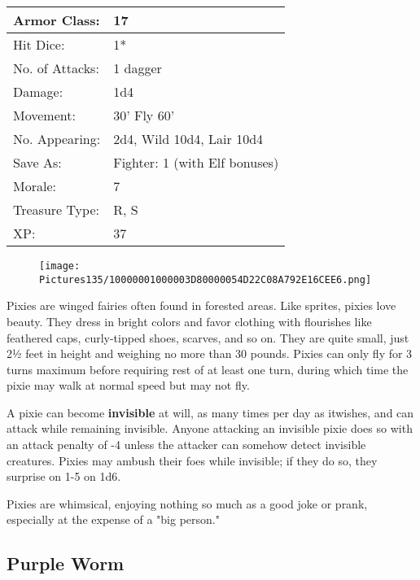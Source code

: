 \documentclass[a4paper,twoside,openany,10pt]{book}
\begin{document}
\begin{multicols}{2}
\begin{tabularx}{0.50\textwidth}{@{}lX@{}}
Armor Class: & 17 \\\hline
Hit Dice: & 1* \\\hline
No. of Attacks: & 1 dagger \\\hline
Damage: & 1d4 \\\hline
Movement: & 30' Fly 60' \\\hline
No. Appearing: & 2d4, Wild 10d4, Lair 10d4 \\\hline
Save As: & Fighter: 1 (with Elf bonuses) \\\hline
Morale: & 7 \\\hline
Treasure Type: & R, S \\\hline
XP: & 37 \\\hline
\end{tabularx}\medskip

\begin{wrapfigure}{l}{0.25\textwidth}
 \texttt{[image: Pictures135/10000001000003D80000054D22C08A792E16CEE6.png]} 
\end{wrapfigure}

Pixies are winged fairies often found in forested areas. Like sprites, pixies love beauty. They dress in bright colors and favor clothing with flourishes like feathered caps, curly-tipped shoes, scarves, and so on. They are quite small, just 2½ feet in height and weighing no more than 30 pounds. Pixies can only fly for 3 turns maximum before requiring rest of at least one turn, during which time the pixie may walk at normal speed but may not fly.

A pixie can become \textbf{invisible }at will, as many times per day as itwishes, and can attack while remaining invisible. Anyone attacking an invisible pixie does so with an attack penalty of -4 unless the attacker can somehow detect invisible creatures. Pixies may ambush their foes while invisible; if they do so, they surprise on 1-5 on 1d6. 

Pixies are whimsical, enjoying nothing so much as a good joke or prank, especially at the expense of a "big person."

\subsection*{Purple Worm}\label{purple-worm}


\end{multicols}
\end{document}
